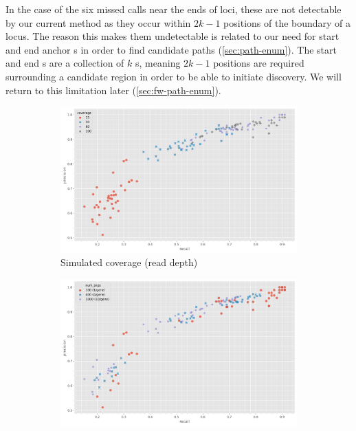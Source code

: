In the case of the six missed calls near the ends of loci, these are not detectable by our current \denovo{} method as they occur within $2k-1$ positions of the boundary of a locus. The reason this makes them undetectable is related to our need for start and end anchor \kmer{}s in order to find candidate paths (\autoref{sec:path-enum}). The start and end \kmer{}s are a collection of $k$ \kmer{}s, meaning $2k-1$ positions are required surrounding a candidate region in order to be able to initiate \denovo{} discovery. We will return to this limitation later (\autoref{sec:fw-path-enum}).

\begin{figure}
     \centering
     \begin{subfigure}[b]{0.475\textwidth}
        \includegraphics[width=1\linewidth]{Chapter1/Figs/denovo_precrec_covg.png}
        \centering
        \caption{Simulated coverage (read depth)}
        \label{fig:denovo-sims-covg}
     \end{subfigure}
     \begin{subfigure}[b]{0.475\textwidth}
         \centering
        \includegraphics[width=1\linewidth]{Chapter1/Figs/denovo_precrec_num_snps.png}

\end{subfigure}
\end{figure}
